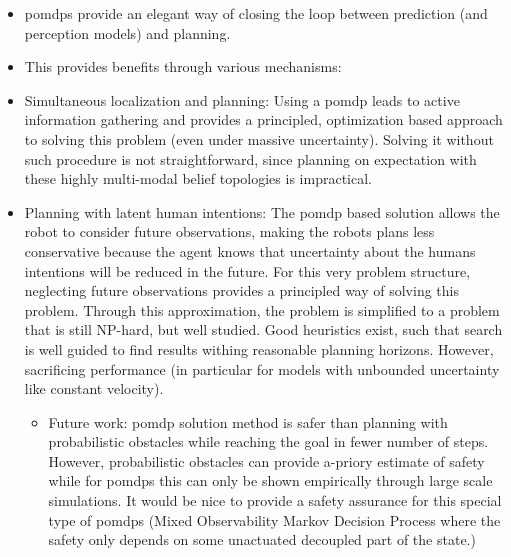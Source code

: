 \begin{itemize}
  \item \acp{pomdp} provide an elegant way of closing the loop between
    prediction (and perception models) and planning.
  \item This provides benefits through various mechanisms:
  \item Simultaneous localization and planning: Using a \ac{pomdp} leads to active
    information gathering and provides a principled, optimization based
    approach to solving this problem (even under massive uncertainty). Solving
    it without such procedure is not straightforward, since planning on expectation
    with these highly multi-modal belief topologies is impractical.
  \item Planning with latent human intentions: The \ac{pomdp} based solution
    allows the robot to consider future observations, making the robots plans
    less conservative because the agent knows that uncertainty about the humans intentions
    will be reduced in the future. For this very problem structure, neglecting future observations
    provides a principled way of solving this problem. Through this
    approximation, the problem is simplified to a problem that is still
    NP-hard, but well studied. Good heuristics exist, such that search is well guided to find results
    withing reasonable planning horizons. However, sacrificing performance (in
    particular for models with unbounded uncertainty like constant velocity).
    \begin{itemize}
      \item Future work: \ac{pomdp} solution method is safer than planning with
      probabilistic obstacles while reaching the goal in fewer number of steps.
      However, probabilistic obstacles can provide a-priory estimate of safety
      while for \acp{pomdp} this can only be shown empirically through large
      scale simulations. It would be nice to provide a safety assurance for
      this special type of \acp{pomdp} (Mixed Observability Markov Decision
      Process where the safety only depends on some unactuated decoupled part
      of the state.)
    \end{itemize}
\end{itemize}

